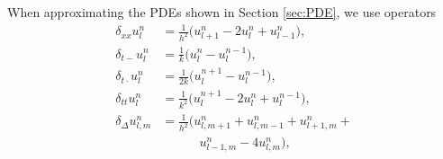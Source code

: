 \documentclass{article}
\begin{document}
When approximating the PDEs shown in Section \ref{sec:PDE}, we use operators 
    \begin{align}
        \label{eq:secondSpacex}\delta_{xx}u_l^n &= \frac{1}{h^2}\big(u_{l+1}^n - 2u_l^n + u_{l-1}^n\big),\\
        \label{eq:backwardsTime}\delta_{t-} u^n_l &= \frac{1}{k}\big(u_l^{n}-u_l^{n-1}\big),\\
        \label{eq:centerTime}\delta_{t\cdot} u^n_l &= \frac{1}{2k}\big(u_l^{n+1}-u_l^{n-1}\big),\\
        \label{eq:secondTime}\delta_{tt}u_l^n &= \frac{1}{k^2} \big(u_l^{n+1} - 2u_l^n + u_l^{n-1}\big),\\
         \label{eq:2D}\delta_\Delta u_{l,m}^n &= \frac{1}{h^2}(u_{l,m+1}^n+u_{l,m-1}^n+u_{l+1,m}^n+ \\
         & \qquad \quad u_{l-1,m}^n - 4u_{l,m}^n),
    \end{align}
\end{document}
